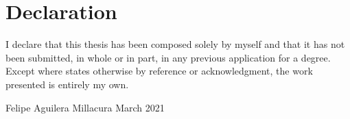 \chapter{Declaration}
\vspace*{2\baselineskip}
I declare that this thesis has been composed solely by myself and that it has not been submitted, in whole or in part, in any previous application for a degree. Except where states otherwise by reference or acknowledgment, the work presented is entirely my own.

\vspace{6\baselineskip}
\begin{flushright}
\hspace*{\fill}
Felipe Aguilera Millacura
\newline
March 2021
\end{flushright}


\cleardoublepage
